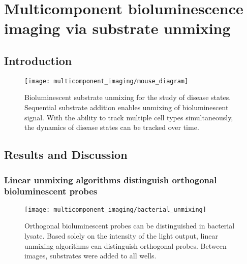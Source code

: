 
\chapter{Multicomponent bioluminescence imaging via substrate unmixing}
\section{Introduction}

\begin{figure}[htb]
\texttt{[image: multicomponent\_imaging/mouse\_diagram]}
\centering
\caption[Bioluminescent substrate unmixing for the study of disease states]{
Bioluminescent substrate unmixing for the study of disease states. Sequential substrate addition enables unmixing of bioluminescent signal. With the ability to track multiple cell types simultaneously, the dynamics of disease states can be tracked over time.
}
  \label{fig:mouse_diagram}
\end{figure}


\section{Results and Discussion}

\subsection{Linear unmixing algorithms distinguish orthogonal bioluminescent probes}
\begin{figure}[htb]
\texttt{[image: multicomponent\_imaging/bacterial\_unmixing]}
\centering
\caption[Orthogonal bioluminescent probes can be distinguished in bacterial lysate]{
Orthogonal bioluminescent probes can be distinguished in bacterial lysate. Based solely on the intensity of the light output, linear unmixing algorithms can distinguish orthogonal probes. Between images, substrates were added to all wells.
}
  \label{fig:bacterial_unmixing}
\end{figure}

